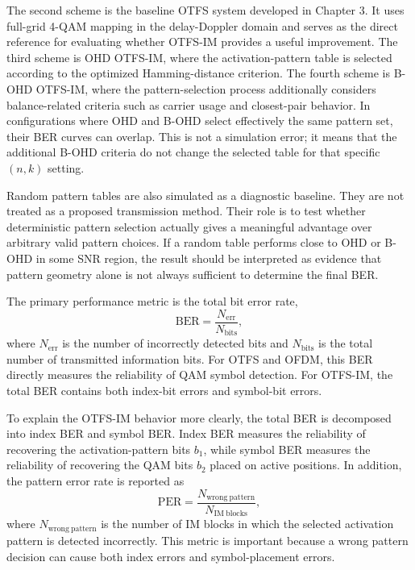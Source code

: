 The second scheme is the baseline OTFS system developed in Chapter 3. It uses full-grid 4-QAM mapping in the delay-Doppler domain and serves as the direct reference for evaluating whether OTFS-IM provides a useful improvement. The third scheme is OHD OTFS-IM, where the activation-pattern table is selected according to the optimized Hamming-distance criterion. The fourth scheme is B-OHD OTFS-IM, where the pattern-selection process additionally considers balance-related criteria such as carrier usage and closest-pair behavior. In configurations where OHD and B-OHD select effectively the same pattern set, their BER curves can overlap. This is not a simulation error; it means that the additional B-OHD criteria do not change the selected table for that specific \((n,k)\) setting.

Random pattern tables are also simulated as a diagnostic baseline. They are not treated as a proposed transmission method. Their role is to test whether deterministic pattern selection actually gives a meaningful advantage over arbitrary valid pattern choices. If a random table performs close to OHD or B-OHD in some SNR region, the result should be interpreted as evidence that pattern geometry alone is not always sufficient to determine the final BER.

The primary performance metric is the total bit error rate,
\begin{equation}
    \mathrm{BER} = \frac{N_{\mathrm{err}}}{N_{\mathrm{bits}}},
    \label{eq:chapter5_ber_definition}
\end{equation}
where \(N_{\mathrm{err}}\) is the number of incorrectly detected bits and \(N_{\mathrm{bits}}\) is the total number of transmitted information bits. For OTFS and OFDM, this BER directly measures the reliability of QAM symbol detection. For OTFS-IM, the total BER contains both index-bit errors and symbol-bit errors.

To explain the OTFS-IM behavior more clearly, the total BER is decomposed into index BER and symbol BER. Index BER measures the reliability of recovering the activation-pattern bits \(b_1\), while symbol BER measures the reliability of recovering the QAM bits \(b_2\) placed on active positions. In addition, the pattern error rate is reported as
\begin{equation}
    \mathrm{PER} = \frac{N_{\mathrm{wrong\ pattern}}}{N_{\mathrm{IM\ blocks}}},
    \label{eq:chapter5_pattern_error_rate}
\end{equation}
where \(N_{\mathrm{wrong\ pattern}}\) is the number of IM blocks in which the selected activation pattern is detected incorrectly. This metric is important because a wrong pattern decision can cause both index errors and symbol-placement errors.

